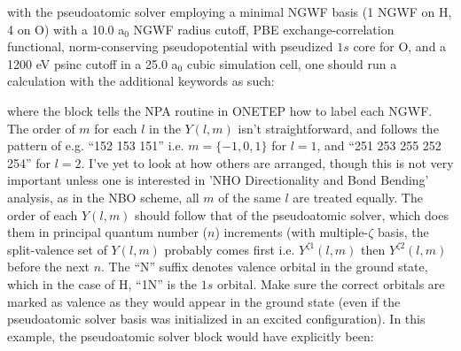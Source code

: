 \documentclass[letterpaper,10pt,english]{sphinxmanual}
\begin{document}
with the pseudoatomic solver employing a minimal NGWF basis (1 NGWF on
H, 4 on O) with a 10.0 a\(_0\) NGWF radius cutoff, PBE
exchange-correlation functional, norm-conserving pseudopotential with
pseudized \(1s\) core for O, and a 1200 eV psinc cutoff in a 25.0
a\(_0\) cubic simulation cell, one should run a 
calculation with the additional keywords as such:
\begin{quote}

%
\begin{sphinxVerbatim}[commandchars=\\\{\}]
 
 
   
   
  
  
 
\end{sphinxVerbatim}
\end{quote}

where the  block tells the NPA routine in ONETEP
how to label each NGWF. The order of \(m\) for each \(l\) in the
\(Y(l,m)\) isn’t straightforward, and follows the pattern of e.g.
“152 153 151” i.e. \(m=\{-1,0,1\}\) for \(l=1\), and “251 253
255 252 254” for \(l=2\). I’ve yet to look at how others are
arranged, though this is not very important unless one is interested in
’NHO Directionality and Bond Bending’ analysis, as in the NBO scheme,
all \(m\) of the same \(l\) are treated equally. The order of
each \(Y(l,m)\) should follow that of the pseudoatomic solver, which
does them in principal quantum number (\(n\)) increments (with
multiple-\(\zeta\) basis, the split-valence set of \(Y(l,m)\)
probably comes first i.e. \(Y^{\zeta1}(l,m)\) then
\(Y^{\zeta2}(l,m)\) before the next \(n\). The “N” suffix
denotes valence orbital in the ground state, which in the case of H,
“1N” is the \(1s\) orbital. Make sure the correct orbitals are
marked as valence as they would appear in the ground state (even if the
pseudoatomic solver basis was initialized in an excited configuration).
In this example, the pseudoatomic solver block would have explicitly
been:
\begin{quote}

%
\begin{sphinxVerbatim}[commandchars=\\\{\}]
 
   
   
 
\end{sphinxVerbatim}
\end{quote}
\end{document}

